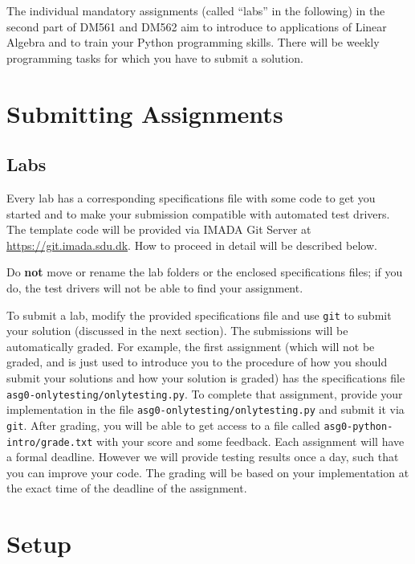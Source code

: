 
The individual mandatory assignments (called ``labs'' in the following) in the second part of DM561 and DM562 aim to introduce to applications of Linear Algebra and to train your Python programming skills. There will be weekly programming tasks for which you have to submit a solution.

\section*{Submitting Assignments} %

\subsection*{Labs}

Every lab has a corresponding specifications file with some code to get you started and to make your submission compatible with automated test drivers. The template code will be provided via IMADA Git Server at \url{https://git.imada.sdu.dk}. How to proceed in detail will be described below.

\begin{warn}
Do \textbf{not} move or rename the lab folders or the enclosed specifications files; if you do, the test drivers will not be able to find your assignment.
\end{warn}

To submit a lab, modify the provided specifications file and use \texttt{git} to submit your solution (discussed in the next section).
The submissions will be automatically graded. 
For example, the first assignment (which will not be graded, and is just used to introduce you to the procedure of how you should submit your solutions and how your solution is graded) has the specifications file \texttt{asg0-onlytesting/onlytesting.py}.
To complete that assignment, provide your implementation in the file \texttt{asg0-onlytesting/onlytesting.py} and submit it via \texttt{git}.
After grading, you will be able to get access to a file called \texttt{asg0-python-intro/grade.txt} with your score and some feedback. Each assignment will have a formal deadline. However we will provide testing results once a day, such that you can improve your code. The grading will be based on your implementation at the exact time of the deadline of the assignment.


\section*{Setup} %

